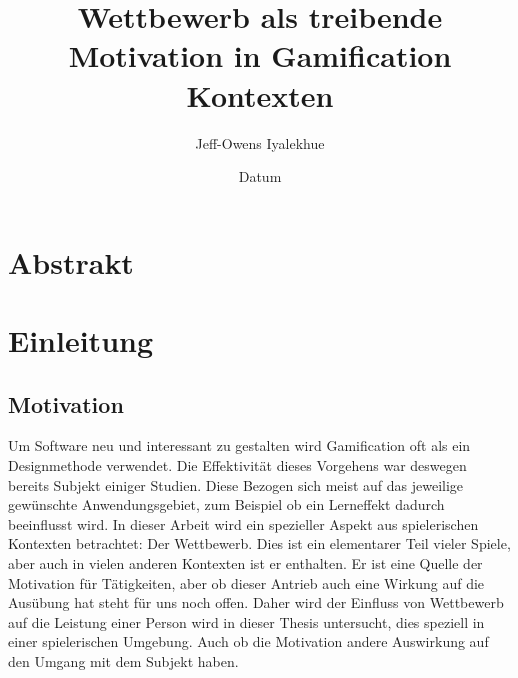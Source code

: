 %
% 
% 
%



\renewcommand{\Thema}{%
                        Wettbewerb als treibende Motivation in Gamification Kontexten}





\title{\Thema}
\author{Jeff-Owens Iyalekhue}
\date{Datum}


\tableofcontents %

\chapter{Abstrakt}

\chapter{Einleitung}
\section{Motivation}
Um Software neu und interessant zu gestalten wird Gamification oft als ein Designmethode verwendet. Die Effektivität dieses Vorgehens war deswegen bereits Subjekt einiger Studien. Diese Bezogen sich meist auf das jeweilige gewünschte Anwendungsgebiet, zum Beispiel ob ein Lerneffekt dadurch beeinflusst wird. In dieser Arbeit wird ein spezieller Aspekt aus spielerischen Kontexten betrachtet: Der Wettbewerb.\newline
Dies ist ein elementarer Teil vieler Spiele, aber auch in vielen anderen Kontexten ist er enthalten. Er ist eine Quelle der Motivation für Tätigkeiten, aber ob dieser Antrieb auch eine Wirkung auf die Ausübung
hat steht für uns noch offen. Daher wird der Einfluss von Wettbewerb auf die Leistung einer Person wird in dieser Thesis untersucht, dies speziell in einer spielerischen Umgebung. Auch ob die Motivation andere Auswirkung auf den Umgang mit dem Subjekt haben.
%
